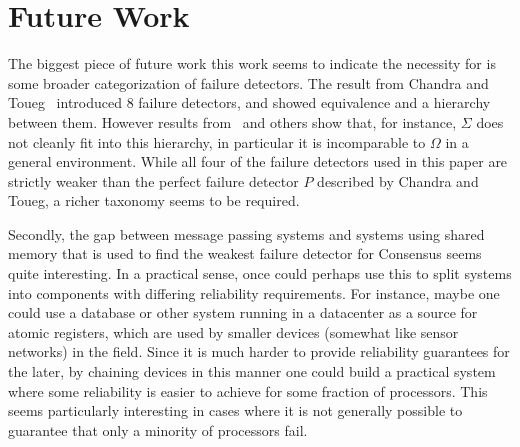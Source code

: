 \section{Future Work}
The biggest piece of future work this work seems to indicate the necessity for is some broader categorization of failure
detectors. The result from Chandra and Toueg~\cite{chandra1996unreliable} introduced $8$ failure detectors, and showed
equivalence and a hierarchy between them. However results from~\cite{delporte2003shared} and others show that, for
instance, $\Sigma$ does not cleanly fit into this hierarchy, in particular it is incomparable to $\Omega$ in a general
environment. While all four of the failure detectors used in this paper are strictly weaker than the perfect failure
detector $P$ described by Chandra and Toueg, a richer taxonomy seems to be required.

Secondly, the gap between message passing systems and systems using shared memory that is used to find the weakest
failure detector for Consensus seems quite interesting. In a practical sense, once could perhaps use this to split
systems into components with differing reliability requirements. For instance, maybe one could use a database or other
system running in a datacenter as a source for atomic registers, which are used by smaller devices (somewhat like sensor
networks) in the field. Since it is much harder to provide reliability guarantees for the later, by chaining devices in
this manner one could build a practical system where some reliability is easier to achieve for some fraction of
processors. This seems particularly interesting in cases where it is not generally possible to guarantee that only a
minority of processors fail.
